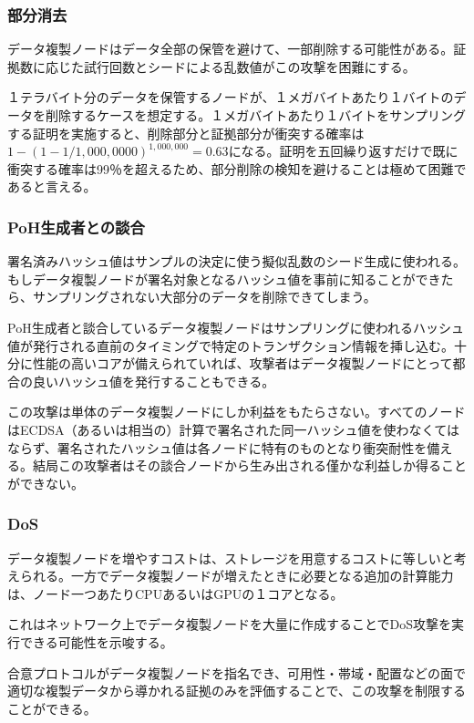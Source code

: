 \documentclass[12pt]{ltjsarticle}
\begin{document}
\subsubsection{部分消去}

データ複製ノードはデータ全部の保管を避けて、一部削除する可能性がある。証拠数に応じた試行回数とシードによる乱数値がこの攻撃を困難にする。

１テラバイト分のデータを保管するノードが、１メガバイトあたり１バイトのデータを削除するケースを想定する。１メガバイトあたり１バイトをサンプリングする証明を実施すると、削除部分と証拠部分が衝突する確率は\(1 - (1- 1/1,000,0000)^{1,000,000} = 0.63\)になる。証明を五回繰り返すだけで既に衝突する確率は99％を超えるため、部分削除の検知を避けることは極めて困難であると言える。

\subsubsection{PoH生成者との談合}

署名済みハッシュ値はサンプルの決定に使う擬似乱数のシード生成に使われる。もしデータ複製ノードが署名対象となるハッシュ値を事前に知ることができたら、サンプリングされない大部分のデータを削除できてしまう。

PoH生成者と談合しているデータ複製ノードはサンプリングに使われるハッシュ値が発行される直前のタイミングで特定のトランザクション情報を挿し込む。十分に性能の高いコアが備えられていれば、攻撃者はデータ複製ノードにとって都合の良いハッシュ値を発行することもできる。

この攻撃は単体のデータ複製ノードにしか利益をもたらさない。すべてのノードはECDSA（あるいは相当の）計算で署名された同一ハッシュ値を使わなくてはならず、署名されたハッシュ値は各ノードに特有のものとなり衝突耐性を備える。結局この攻撃者はその談合ノードから生み出される僅かな利益しか得ることができない。

\subsubsection{DoS}
データ複製ノードを増やすコストは、ストレージを用意するコストに等しいと考えられる。一方でデータ複製ノードが増えたときに必要となる追加の計算能力は、ノード一つあたりCPUあるいはGPUの１コアとなる。

これはネットワーク上でデータ複製ノードを大量に作成することでDoS攻撃を実行できる可能性を示唆する。

合意プロトコルがデータ複製ノードを指名でき、可用性・帯域・配置などの面で適切な複製データから導かれる証拠のみを評価することで、この攻撃を制限することができる。
\end{document}
